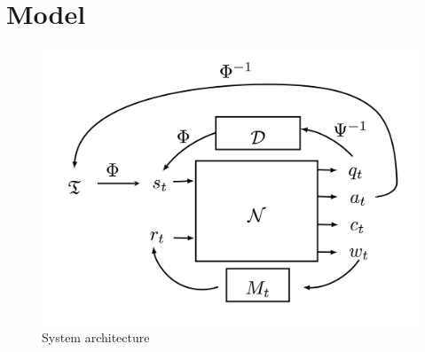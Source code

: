 \documentclass{article} %
\theoremstyle{named}
\begin{document}
\section{Model}
\begin{figure}[ht]
\begin{center}
\centerline{\includegraphics[width=\columnwidth]{jamesdiag}}
\caption{System architecture}
\label{sysarch}
\end{center}
\end{figure}
%     
\end{document}
